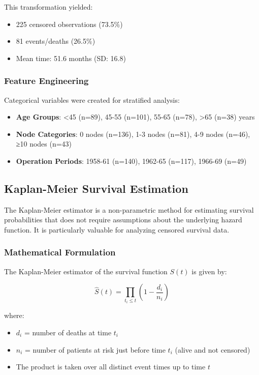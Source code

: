 \documentclass[12pt,a4paper]{article}
\begin{document}
This transformation yielded:
\begin{itemize}
    \item 225 censored observations (73.5\%)
    \item 81 events/deaths (26.5\%)
    \item Mean time: 51.6 months (SD: 16.8)
\end{itemize}

\subsubsection{Feature Engineering}

Categorical variables were created for stratified analysis:

\begin{itemize}
    \item \textbf{Age Groups}: <45 (n=89), 45-55 (n=101), 55-65 (n=78), >65 (n=38) years
    \item \textbf{Node Categories}: 0 nodes (n=136), 1-3 nodes (n=81), 4-9 nodes (n=46), ≥10 nodes (n=43)
    \item \textbf{Operation Periods}: 1958-61 (n=140), 1962-65 (n=117), 1966-69 (n=49)
\end{itemize}

\subsection{Kaplan-Meier Survival Estimation}

The Kaplan-Meier estimator is a non-parametric method for estimating survival probabilities that does not require assumptions about the underlying hazard function. It is particularly valuable for analyzing censored survival data.

\subsubsection{Mathematical Formulation}

The Kaplan-Meier estimator of the survival function \(S(t)\) is given by:

\begin{equation}
\hat{S}(t) = \prod_{t_i \leq t} \left(1 - \frac{d_i}{n_i}\right)
\label{eq:km_estimator}
\end{equation}

where:
\begin{itemize}
    \item \(d_i\) = number of deaths at time \(t_i\)
    \item \(n_i\) = number of patients at risk just before time \(t_i\) (alive and not censored)
    \item The product is taken over all distinct event times up to time \(t\)
\end{itemize}
\end{document}
